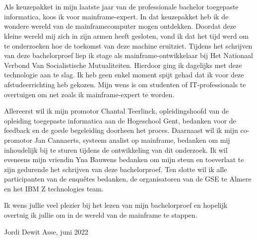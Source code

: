 
\chapter*{}
\label{ch:voorwoord}


Als keuzepakket in mijn laatste jaar van de professionale bachelor toegepaste informatica, koos ik voor mainframe-expert. In dat keuzepakket heb ik de wondere wereld van de mainframecomputer mogen ontdekken. Doordat deze kleine wereld mij zich in zijn armen heeft gesloten, vond ik dat het tijd werd om te onderzoeken hoe de toekomst van deze machine eruitziet. Tijdens het schrijven van deze bachelorproef liep ik stage als mainframe-ontwikkelaar bij Het Nationaal Verbond Van Socialistische Mutualiteiten. Hierdoor ging ik dagelijks met deze technologie aan te slag. Ik heb geen enkel moment spijt gehad dat ik voor deze afstudeerrichting heb gekozen. Mijn wens is om studenten of IT-professionals te overtuigen om net zoals ik mainframe-expert te worden. 

Allereerst wil ik mijn promotor Chantal Teerlinck, opleidingshoofd van de opleiding toegepaste informatica aan de Hogeschool Gent, bedanken voor de feedback en de goede begeleiding doorheen het proces. Daarnaast wil ik mijn co-promotor Jan Cannaerts,  systeem analist op mainframe, bedanken om mij inhoudelijk bij te sturen tijdens de ontwikkeling van dit onderzoek. Ik wil eveneens mijn vriendin Yna Bauwens bedanken om mijn steun en toeverlaat te zijn gedurende het schrijven van deze bachelorproef. Ten slotte wil ik alle participanten van de enquêtes bedanken, de organisatoren van de GSE te Almere en het IBM Z technologies team. 

Ik wens jullie veel plezier bij het lezen van mijn bachelorproef en hopelijk overtuig ik jullie om in de wereld van de mainframe te stappen. 

Jordi Dewit \newline
Asse, juni 2022